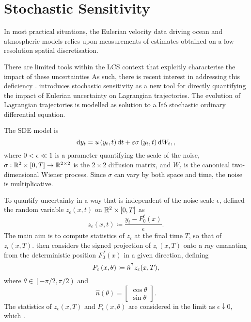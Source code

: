 \section{Stochastic Sensitivity}
In most practical situations, the Eulerian velocity data driving ocean and atmospheric models relies upon measurements of estimates obtained on a low resolution spatial discretisation.


There are limited tools within the LCS context that explcitly characterise the impact of these uncertainties
As such, there is recent interest in addressing this deficiency \citep{BalasuriyaGottwald_2018_EstimatingStableUnstablea, Balasuriya_2020_StochasticApproachesLagrangian}.
\cite{Balasuriya_2020_StochasticSensitivityComputable} introduces stochastic sensitivity as a new tool for directly quantifying the impact of Eulerian uncertainty on Lagrangian trajectories.
The evolution of Lagrangian trajectories is modelled as solution to a It\^o stochastic ordinary differential equation.


The SDE model is
\begin{equation}
	\sde{y_t}{u\left(y_t, t\right)}{\epsilon\sigma\left(y_t, t\right)},
	\label{eqn:ss_sde},
\end{equation}
where \(0 < \epsilon \ll 1\) is a parameter quantifying the scale of the noise, \(\sigma:	\mathbb{R}^2\times[0,T] \to \mathbb{R}^{2\times 2}\) is the \(2\times 2\) diffusion matrix, and \(W_t\) is the canonical two-dimensional Wiener process.
Since \(\sigma\) can vary by both space and time, the noise is multiplicative.

To quantify uncertainty in a way that is independent of the noise scale \(\epsilon\), \cite{Balasuriya_2020_StochasticSensitivityComputable} defined the random variable \(z_\epsilon\left(x,t\right)\) on \(\mathbb{R}^2 \times [0,T]\) as
\[
	z_\epsilon\left(x,t\right) \coloneqq \frac{y_t - F_0^t(x)}{\epsilon}.
\]
The main aim is to compute statistics of \(z_\epsilon\) at the final time \(T\), so that of \(z_\epsilon\left(x,T\right)\).
\cite{Balasuriya_2020_StochasticSensitivityComputable} then considers the signed projection of \(z_\epsilon\left(x,T\right)\) onto a ray emanating from the deterministic position \(F_0^T(x)\) in a given direction, defining
\[
	P_\varepsilon\left(x,\theta\right) \coloneqq \hat{n}^{^{\intercal}} z_\varepsilon(x,T),
\]
where \(\theta \in \left[-\pi/2, \pi/2\right)\) and
\[
	\hat{n}(\theta) = \begin{bmatrix}
		\cos{\theta} \\
		\sin{\theta}
	\end{bmatrix}.
\]
The statistics of \(z_\epsilon\left(x,T\right)\) and \(P_\epsilon(x,\theta)\) are considered in the limit as \(\epsilon\downarrow 0\), which .


